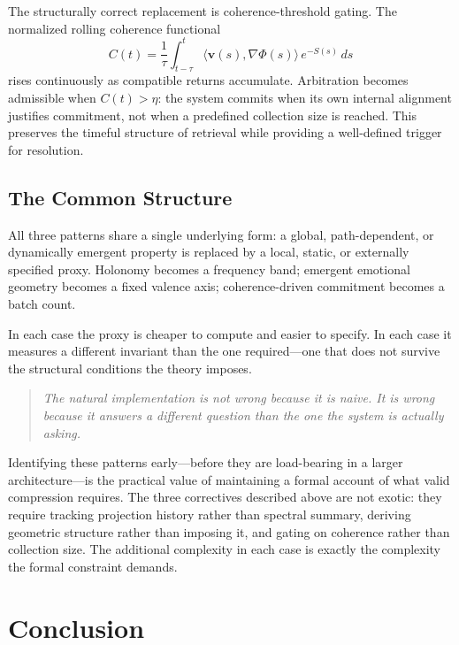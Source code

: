 \documentclass[12pt,a4paper]{article}
\begin{document}
The structurally correct replacement is coherence-threshold gating. The normalized rolling coherence functional
\[
C(t) = \frac{1}{\tau} \int_{t-\tau}^{t} \langle \mathbf{v}(s), \nabla\Phi(s) \rangle\, e^{-S(s)}\, ds
\]
rises continuously as compatible returns accumulate. Arbitration becomes admissible when $C(t) > \eta$: the system commits when its own internal alignment justifies commitment, not when a predefined collection size is reached. This preserves the timeful structure of retrieval while providing a well-defined trigger for resolution.

\subsection{The Common Structure}

All three patterns share a single underlying form: a global, path-dependent, or dynamically emergent property is replaced by a local, static, or externally specified proxy. Holonomy becomes a frequency band; emergent emotional geometry becomes a fixed valence axis; coherence-driven commitment becomes a batch count.

In each case the proxy is cheaper to compute and easier to specify. In each case it measures a different invariant than the one required---one that does not survive the structural conditions the theory imposes.

\begin{quote}
\emph{The natural implementation is not wrong because it is naive. It is wrong because it answers a different question than the one the system is actually asking.}
\end{quote}

Identifying these patterns early---before they are load-bearing in a larger architecture---is the practical value of maintaining a formal account of what valid compression requires. The three correctives described above are not exotic: they require tracking projection history rather than spectral summary, deriving geometric structure rather than imposing it, and gating on coherence rather than collection size. The additional complexity in each case is exactly the complexity the formal constraint demands.

\section{Conclusion}
\label{sec:conclusion}
\end{document}
